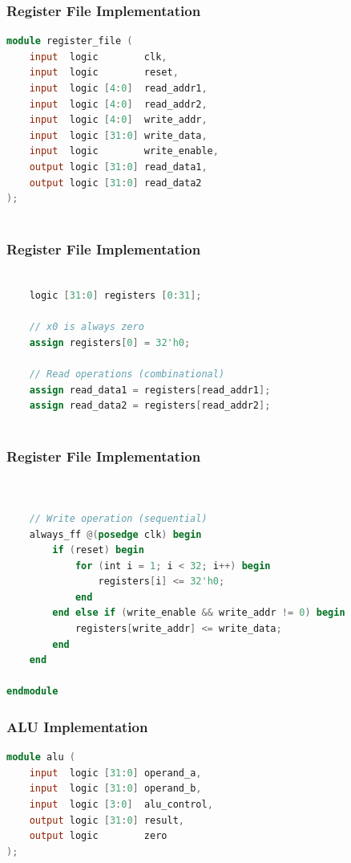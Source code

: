 \documentclass[aspectratio=169,xcolor=dvipsnames]{beamer}
\begin{document}
\begin{frame}[fragile]
\frametitle{Register File Implementation}
\begin{lstlisting}[language=Verilog]
module register_file (
    input  logic        clk,
    input  logic        reset,
    input  logic [4:0]  read_addr1,
    input  logic [4:0]  read_addr2,
    input  logic [4:0]  write_addr,
    input  logic [31:0] write_data,
    input  logic        write_enable,
    output logic [31:0] read_data1,
    output logic [31:0] read_data2
);
    
\end{lstlisting}
\end{frame}

\begin{frame}[fragile]
\frametitle{Register File Implementation}
\begin{lstlisting}[language=Verilog]
    
    logic [31:0] registers [0:31];
    
    // x0 is always zero
    assign registers[0] = 32'h0;
    
    // Read operations (combinational)
    assign read_data1 = registers[read_addr1];
    assign read_data2 = registers[read_addr2];
    
\end{lstlisting}
\end{frame}

\begin{frame}[fragile]
\frametitle{Register File Implementation}
\begin{lstlisting}[language=Verilog]
    
    
    // Write operation (sequential)
    always_ff @(posedge clk) begin
        if (reset) begin
            for (int i = 1; i < 32; i++) begin
                registers[i] <= 32'h0;
            end
        end else if (write_enable && write_addr != 0) begin
            registers[write_addr] <= write_data;
        end
    end
    
endmodule
\end{lstlisting}
\end{frame}


\begin{frame}[fragile]
\frametitle{ALU Implementation}
\begin{lstlisting}[language=Verilog]
module alu (
    input  logic [31:0] operand_a,
    input  logic [31:0] operand_b,
    input  logic [3:0]  alu_control,
    output logic [31:0] result,
    output logic        zero
);
\end{lstlisting}
\end{frame}
\end{document}
